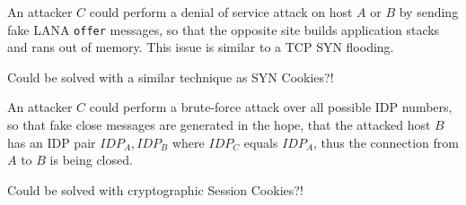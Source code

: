 \documentclass[times,10pt,twocolumn]{article}
\begin{document}
An attacker $C$ could perform a denial of service attack on host $A$ or $B$ by
sending fake LANA \texttt{offer} messages, so that the opposite site builds 
application stacks and rans out of memory. This issue is similar to a TCP SYN 
flooding.\newline

Could be solved with a similar technique as SYN Cookies?!

An attacker $C$ could perform a brute-force attack over all possible IDP numbers, 
so that fake close messages are generated in the hope, that the attacked host $B$
has an IDP pair $IDP_A,IDP_B$ where $IDP_C$ equals $IDP_A$, thus the connection
from $A$ to $B$ is being closed.\newline

Could be solved with cryptographic Session Cookies?!

\nocite{*}


\end{document}
